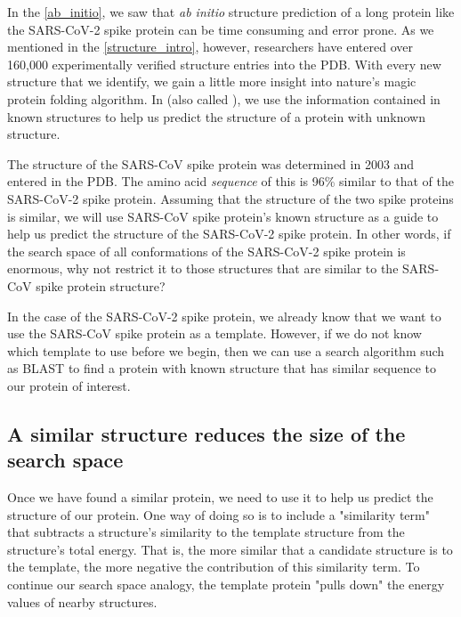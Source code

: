 {{In the \autoref{ab_initio}, we saw that \textit{ab initio} structure prediction of a long protein like the SARS-CoV-2 spike protein can be time consuming and error prone. As we mentioned in the \autoref{structure_intro}, however, researchers have entered over 160,000 experimentally verified structure entries into the PDB. With every new structure that we identify, we gain a little more insight into nature's magic protein folding algorithm. In  (also called ), we use the information contained in known structures to help us predict the structure of a protein with unknown structure.

The structure of the SARS-CoV spike protein was determined in 2003 and entered in the PDB. The amino acid \textit{sequence} of this  is 96\% similar to that of the SARS-CoV-2 spike protein. Assuming that the structure of the two spike proteins is similar, we will use SARS-CoV spike protein's known structure as a guide to help us predict the structure of the SARS-CoV-2 spike protein. In other words, if the search space of all conformations of the SARS-CoV-2 spike protein is enormous, why not restrict it to those structures that are similar to the SARS-CoV spike protein structure?

In the case of the SARS-CoV-2 spike protein, we already know that we want to use the SARS-CoV spike protein as a template. However, if we do not know which template to use before we begin, then we can use a search algorithm such as BLAST to find a protein with known structure that has similar sequence to our protein of interest.

\FloatBarrier
{}
\subsection{A similar structure reduces the size of the search space}

Once we have found a similar protein, we need to use it to help us predict the structure of our protein. One way of doing so is to include a "similarity term" that subtracts a structure's similarity to the template structure from the structure's total energy. That is, the more similar that a candidate structure is to the template, the more negative the contribution of this similarity term. To continue our search space analogy, the template protein "pulls down" the energy values of nearby structures.

}}
